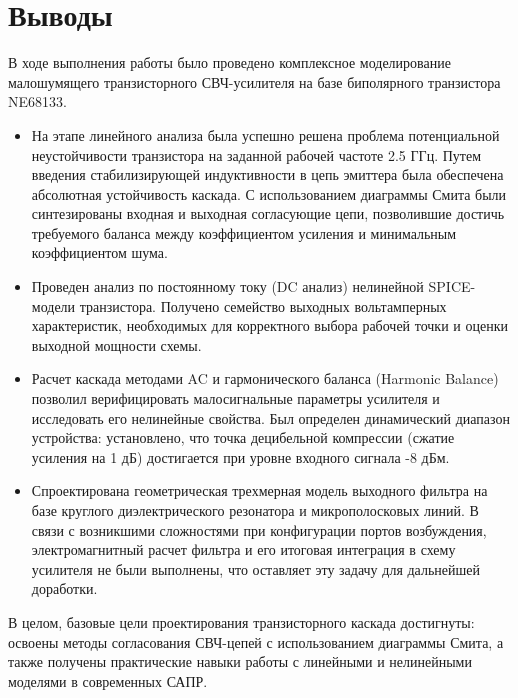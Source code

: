 \section*{Выводы}

В ходе выполнения работы было проведено комплексное моделирование малошумящего транзисторного СВЧ-усилителя на базе биполярного транзистора NE68133. 

\begin{itemize}
    \item На этапе линейного анализа была успешно решена проблема потенциальной неустойчивости транзистора на заданной рабочей частоте 2.5 ГГц. Путем введения стабилизирующей индуктивности в цепь эмиттера была обеспечена абсолютная устойчивость каскада. С использованием диаграммы Смита были синтезированы входная и выходная согласующие цепи, позволившие достичь требуемого баланса между коэффициентом усиления и минимальным коэффициентом шума.
    
    \item Проведен анализ по постоянному току (DC анализ) нелинейной SPICE-модели транзистора. Получено семейство выходных вольтамперных характеристик, необходимых для корректного выбора рабочей точки и оценки выходной мощности схемы.
    
    \item Расчет каскада методами AC и гармонического баланса (Harmonic Balance) позволил верифицировать малосигнальные параметры усилителя и исследовать его нелинейные свойства. Был определен динамический диапазон устройства: установлено, что точка децибельной компрессии (сжатие усиления на 1 дБ) достигается при уровне входного сигнала -8 дБм.
    
    \item Спроектирована геометрическая трехмерная модель выходного фильтра на базе круглого диэлектрического резонатора и микрополосковых линий. В связи с возникшими сложностями при конфигурации портов возбуждения, электромагнитный расчет фильтра и его итоговая интеграция в схему усилителя не были выполнены, что оставляет эту задачу для дальнейшей доработки.
\end{itemize}

В целом, базовые цели проектирования транзисторного каскада достигнуты: освоены методы согласования СВЧ-цепей с использованием диаграммы Смита, а также получены практические навыки работы с линейными и нелинейными моделями в современных САПР.